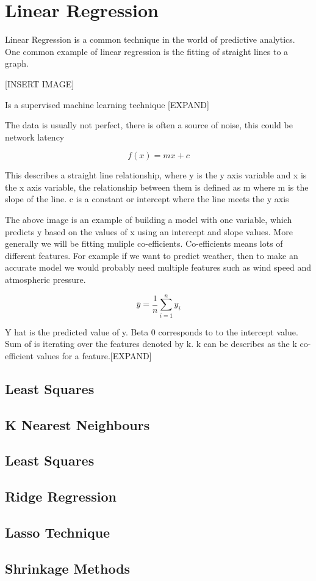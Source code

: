 \section{Linear Regression}

Linear Regression is a common technique in the world of predictive analytics. One common example of linear regression is the fitting of straight lines to a graph. 

[INSERT IMAGE]

Is a supervised machine learning technique [EXPAND]

The data is usually not perfect, there is often a source of noise, this could be network latency

\begin{equation}
    f(x) = mx+c
\end{equation}

This describes a straight line relationship, where y is the y axis variable and x is the x axis variable, the relationship between them is defined as m where m is the slope of the line. c is a constant or intercept where the line meets the y axis

The above image is an example of building a model with one variable, which predicts y based on the values of x using an intercept and slope values. More generally we will be fitting muliple co-efficients. Co-efficients means lots of different features. For example if we want to predict weather, then to make an accurate model we would probably need multiple features such as wind speed and atmospheric pressure.

\begin{equation}
\bar{y} = \frac{1}{n}\sum_{i=1}^n y_i
\end{equation}

Y hat is the predicted value of y. Beta 0 corresponds to to the intercept value. Sum of is iterating over the features denoted by k. k can be describes as the k co-efficient values for a feature.[EXPAND]


\subsection*{Least Squares}
\subsection*{K Nearest Neighbours}
\subsection*{Least Squares}
\subsection*{Ridge Regression}
\subsection*{Lasso Technique}

\subsection*{Shrinkage Methods}